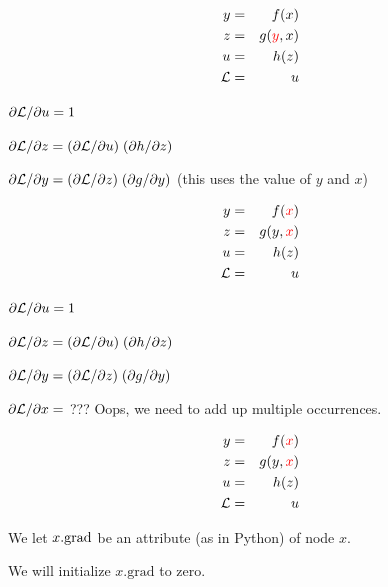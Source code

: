 {
\vspace{-3ex}
\begin{eqnarray*}
  y & = & f(x) \\
  z & = & g({\color{red} y},x) \\
  u & = & h(z) \\
  {\cal L} &  = &  u
\end{eqnarray*}

\medskip
${\partial {\cal L}}/{\partial u} = 1$

\medskip
${\partial {\cal L}}/{\partial z} = ({\partial {\cal L}}/{\partial u})\; ({\partial h}/{\partial z})$

\medskip
{\color{red} ${\partial {\cal L}}/{\partial y} = ({\partial {\cal L}}/{\partial z})\; ({\partial g}/{\partial y})$} (this uses the value of $y$ and $x$)

\vspace{-3ex}
\begin{eqnarray*}
  y & = & f({\color{red} x}) \\
  z & = & g(y,{\color{red} x}) \\
  u & = & h(z) \\
  {\cal L} &  = &  u
\end{eqnarray*}

\medskip
${\partial {\cal L}}/{\partial u} = 1$

\medskip
${\partial {\cal L}}/{\partial z} = ({\partial {\cal L}}/{\partial u})\; ({\partial h}/{\partial z})$

\medskip
${\partial {\cal L}}/{\partial y} = ({\partial {\cal L}}/{\partial z})\; ({\partial g}/{\partial y})$

\medskip
{\color{red} ${\partial {\cal L}}/{\partial x} =$ ???} Oops, we need to add up multiple occurrences.

\vspace{-3ex}
\begin{eqnarray*}
  y & = & f({\color{red} x}) \\
  z & = & g(y,{\color{red} x}) \\
  u & = & h(z) \\
  {\cal L} &  = &  u
\end{eqnarray*}

\medskip
We let {\color{red} $x.\mathrm{grad}$} be an attribute (as in Python) of node {\color{red} $x$}.

\bigskip
\bigskip
We will initialize {\color{red} $x.\mathrm{grad}$} to zero.

}
